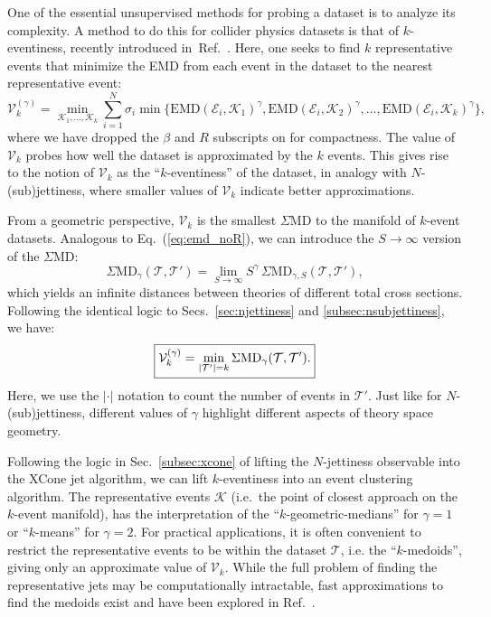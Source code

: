 \documentclass[letterpaper,11pt]{article}
\DeclareRobustCommand{\Sec}[1]{Sec.~\ref{#1}}
\DeclareRobustCommand{\Secs}[2]{Secs.~\ref{#1} and \ref{#2}}
\DeclareRobustCommand{\Eq}[1]{Eq.~(\ref{#1})}
\DeclareRobustCommand{\Ref}[1]{Ref.~\cite{#1}}
\begin{document}
One of the essential unsupervised methods for probing a dataset is to analyze its complexity.
%
A method to do this for collider physics datasets is that of $k$-eventiness, recently introduced in~\Ref{Komiske:2019jim}.
%
Here, one seeks to find $k$ representative events that minimize the EMD from each event in the dataset to the nearest representative event:
%
\begin{equation}
\mathcal V^{(\gamma)}_k = \min_{\mathcal K_1, \ldots,\mathcal K_k}\sum_{i=1}^N \sigma_i \min\{\text{EMD}(\mathcal E_i, \mathcal K_1)^\gamma, \text{EMD}(\mathcal E_i, \mathcal K_2)^\gamma, \ldots, \text{EMD}(\mathcal E_i, \mathcal K_k)^\gamma\},
\end{equation}
%
where we have dropped the $\beta$ and $R$ subscripts on  for compactness.
%
The value of $\mathcal V_k$ probes how well the dataset is approximated by the $k$ events.
%
This gives rise to the notion of $\mathcal V_k$ as the ``$k$-eventiness'' of the dataset, in analogy with $N$-(sub)jettiness, where smaller values of $\mathcal V_k$ indicate better approximations.


From a geometric perspective, $\mathcal V_k$ is the smallest $\Sigma$MD to the manifold of $k$-event datasets.
%
Analogous to \Eq{eq:emd_noR}, we can introduce the $S \to \infty$ version of the $\Sigma$MD:
%
\begin{equation}
\label{eq:smd_noR}
\text{$\Sigma$MD}_{\gamma} (\mathcal T, \mathcal T') = \lim_{S \to \infty} S^\gamma \, \text{$\Sigma$MD}_{\gamma,S} (\mathcal T, \mathcal T'),
\end{equation}
%
which yields an infinite distances between theories of different total cross sections.
%
Following the identical logic to \Secs{sec:njettiness}{subsec:nsubjettiness}, we have:
%
\begin{equation}
\label{eq:keventiness_EMD}
\begin{boxed}{
\mathcal V^{(\gamma)}_k = \min_{|\mathcal T'|=k} \text{$\Sigma$MD}_\gamma(\mathcal T, \mathcal T').
}\end{boxed}
\end{equation}
%
Here, we use the $|\cdot|$ notation to count the number of events in $\mathcal T'$.
%
Just like for $N$-(sub)jettiness, different values of $\gamma$ highlight different aspects of theory space geometry.


Following the logic in \Sec{subsec:xcone} of lifting the $N$-jettiness observable into the XCone jet algorithm, we can lift $k$-eventiness into an event clustering algorithm.
%
The representative events $\mathcal K$ (i.e.\ the point of closest approach on the $k$-event manifold), has the interpretation of the ``$k$-geometric-medians'' for $\gamma = 1$ or ``$k$-means'' for $\gamma = 2$.
%
For practical applications, it is often convenient to restrict the representative events to be within the dataset $\mathcal T$, i.e. the ``$k$-medoids'', giving only an approximate value of $\mathcal V_k$.
%
While the full problem of finding the representative jets may be computationally intractable, fast approximations to find the medoids exist and have been explored in \Ref{Komiske:2019jim}.
\end{document}
